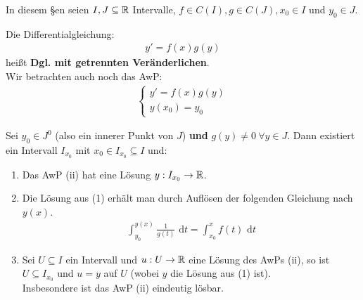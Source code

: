 \documentclass[a4paper,twoside,DIV15,BCOR12mm,chapterprefix=true,headings=twolinechapter]{scrbook}
\begin{document}
In diesem §en seien $I,J\subseteq\mathbb{R}$ Intervalle, $f\in C(I),g\in C(J),x_0\in I$ und
$y_0\in J$.

\begin{definition}
Die Differentialgleichung:
\begin{align*}
y'=f(x)g(y)\tag{i}
\end{align*}
heißt \textbf{Dgl. mit getrennten Veränderlichen}.\\
Wir betrachten auch noch das AwP:
\begin{align*}
\begin{cases}
y'=f(x)g(y)\\
y(x_0)=y_0
\end{cases}
\tag{ii}
\end{align*}
\end{definition}

\begin{satz}[Lösungen]
Sei $y_0\in J^0$ (also ein innerer Punkt von $J$) \textbf{und} $g(y)\ne 0\ \forall y\in J$.
Dann existiert ein Intervall $I_{x_0}$ mit $x_0\in I_{x_0}\subseteq I$ und:
\begin{enumerate}
\item Das AwP (ii) hat eine Lösung $y:I_{x_0}\to\mathbb{R}$.
\item Die Lösung aus (1) erhält man durch Auflösen der folgenden Gleichung nach $y(x)$.
\begin{align*}
\int_{y_0}^{y(x)}\frac 1{g(t)}\text{ d}t=\int_{x_0}^x f(t)\text{ d}t\tag{$*$}
\end{align*}
\item Sei $U\subseteq I$ ein Intervall und $u:U\to\mathbb{R}$ eine Lösung des AwPs (ii),
so ist $U\subseteq I_{x_0}$ und $u=y$ auf $U$ (wobei $y$ die Lösung aus (1) ist).\\
Insbesondere ist das AwP (ii) eindeutig lösbar.
\end{enumerate}
\end{satz}
\end{document}
